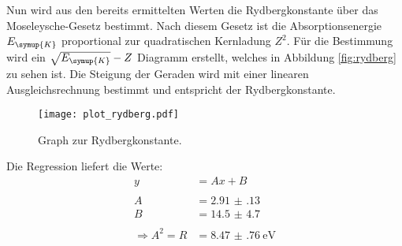 Nun wird aus den bereits ermittelten Werten die Rydbergkonstante über das Moseleysche-Gesetz
bestimmt. Nach diesem Gesetz ist die Absorptionsenergie $E_\symup{K}$ proportional zur
quadratischen Kernladung $Z^2$. Für die Bestimmung wird ein $\sqrt{E_\symup{K}}-Z$ Diagramm
erstellt, welches in Abbildung \eqref{fig:rydberg} zu sehen ist. Die Steigung der Geraden
wird mit einer linearen Ausgleichsrechnung bestimmt und entspricht der Rydbergkonstante.

\begin{figure}[H]
  \centering
  \texttt{[image: plot\_rydberg.pdf]}
  \caption{Graph zur Rydbergkonstante.}
  \label{fig:rydberg}
\end{figure}

Die Regression liefert die Werte:
\begin{align*}
  y &= Ax+B\\\\
  A &= \num{2.91(13)}\\
  B &= \num{14.5(47)}\\\\
  \Rightarrow A^2 = R &= \SI{8.47(76)}{\eV}
\end{align*}

